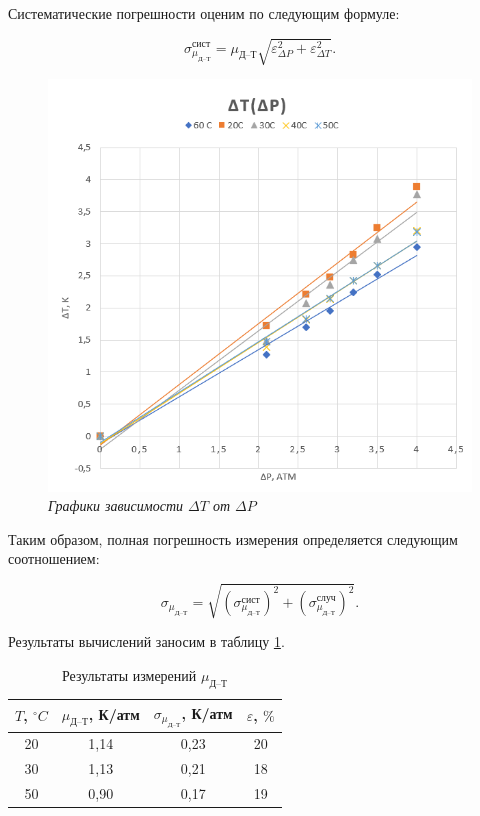 \documentclass[a4paper,12pt]{article} %
\begin{document}
Систематические погрешности оценим по следующим формуле:

\[ \sigma^\text{сист}_{\mu_\text{Д--Т}} = {\mu_\text{Д--Т}}\sqrt{\varepsilon^2_{\Delta P}+\varepsilon^2_{\Delta T}}.\]

\begin{figure}[H]
	\begin{center}
        \includegraphics[width = 16 cm]{graph.png}
    \end{center}
    \caption{\textit{Графики зависимости $ \Delta T $ от $ \Delta P $}}
\end{figure}

Таким образом, полная погрешность измерения определяется следующим соотношением:

\[ \sigma_{\mu_\text{Д--Т}} = \sqrt{(\sigma_{\mu_\text{Д--Т}}^\text{сист})^2 + (\sigma_{\mu_\text{Д--Т}}^\text{случ})^2}.\]

Результаты вычислений заносим в таблицу \ref{tab:my-table}.
\label{koef}
\begin{table}[H]
	\centering
	\begin{tabular}{|c|c|c|c|}
		\hline
		$ T $, $ ^\circ C $ & $ \mu_\text{Д--Т} $, К/атм & $ \sigma_{\mu_\text{Д--Т}} $, К/атм & $ \varepsilon $, $ \% $ \\ \hline
		20 & 1,14 & 0,23 & 20 \\ \hline
		30 & 1,13 & 0,21 & 18 \\ \hline
		50 & 0,90 & 0,17 & 19 \\ \hline
	\end{tabular}
	\caption{Результаты измерений $ \mu_\text{Д--Т} $}
	\label{tab:my-table}
\end{table}
\end{document}
